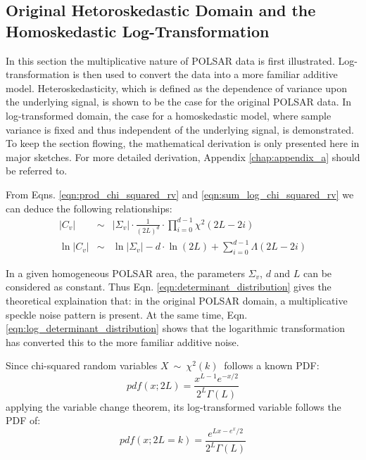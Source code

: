 \documentclass[journal]{IEEEtran}
\begin{document}
\subsection{Original Hetoroskedastic Domain and the Homoskedastic Log-Transformation}
\label{sec:polsar_heterosked_model_and_log_transform}

In this section the multiplicative nature of POLSAR data is first illustrated.
 Log-transformation is then used to  convert  the data into a more familiar additive model.
Heteroskedasticity, which is defined as the dependence of variance upon the underlying signal,
  is shown to be the case for the original POLSAR data.
In log-transformed domain, the case for a homoskedastic model,
  where sample variance is fixed and thus independent of the underlying signal,
  is demonstrated.
To keep the section flowing, the mathematical derivation is only presented here in major sketches.
For more detailed derivation, Appendix \ref{chap:appendix_a} should be referred to.

From Eqns. \ref{eqn:prod_chi_squared_rv} and \ref{eqn:sum_log_chi_squared_rv}
we can deduce the following relationships:
\begin{eqnarray}
  |C_v| &\sim& |\Sigma_v| \cdot \frac{1}{(2L)^d} \cdot \prod_{i=0}^{d-1} \chi^2 (2L-2i) \label{eqn:determinant_distribution} \\
  \ln|C_v| &\sim& \ln|\Sigma_v| - d \cdot \ln(2L) + \sum^{d-1}_{i=0} \Lambda(2L-2i)
\label{eqn:log_determinant_distribution}  
\end{eqnarray}

In a given homogeneous POLSAR area, the parameters $\Sigma_v$, $d$ and $L$ can be considered as constant.
Thus Eqn. \ref{eqn:determinant_distribution} gives the theoretical explaination that: 
  in the original POLSAR domain, a multiplicative speckle noise pattern is present.
At the same time, Eqn. \ref{eqn:log_determinant_distribution} shows that
  the logarithmic transformation has converted this to the more familiar additive noise.  

Since chi-squared random variables $X\ \sim\ \chi^2(k)\ $ follows a known PDF:
\begin{equation}
pdf(x;2L) =
  \frac{x^{L-1} e^{-x/2}}{2^L \Gamma\left(L\right)}
\label{eqn:chi_squared_dist_pdf:chap4}
\end{equation}
applying the variable change theorem, 
  its log-transformed variable follows the PDF of:
\begin{equation}
  pdf(x;2L=k) = \frac{e^{Lx-e^x/2}}{2^{L}\Gamma(L)}
\end{equation}
\end{document}
